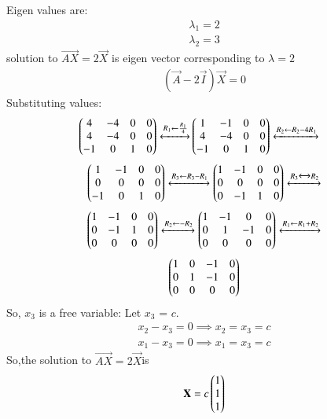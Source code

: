 \documentclass[journal,12pt,twocolumn]{IEEEtran}
\begin{document}
Eigen values are:
\begin{align}
 \lambda_1=2\\
 \lambda_2=3
 \end{align}
solution to $\vec{AX} =2\vec{X}$ is eigen vector corresponding to $\lambda=2$
\begin{align}
    (\vec{A}-2\vec{I})\vec X=0
\end{align}
Substituting values:
\begin{align}
\begin{pmatrix}4& -4&0&0\\
4 & -4 & 0&0\\
-1 & 0 &1&0
\end{pmatrix}
\xleftrightarrow[]{R_1 \leftarrow \frac{R_1}{4}} 
&
\begin{pmatrix}1&-1&0&0\\
4&-4&0&0\\
-1&0&1&0\end{pmatrix}
\xleftrightarrow[]{R_2 \leftarrow R_2-4R_1 } \nonumber 
\end{align}
\begin{align}
    \begin{pmatrix}1&-1&0&0\\
            0&0&0&0\\
            -1&0&1&0\end{pmatrix}
    \xleftrightarrow[]{R_3 \leftarrow R_3-R_1 }
    \begin{pmatrix}1&-1&0&0\\
            0&0&0&0\\
            0&-1&1&0\end{pmatrix}
    \xleftrightarrow[]{R_3 \xleftrightarrow[]{} R_2 } \nonumber
\end{align}
\begin{align}
    \begin{pmatrix}1&-1&0&0\\
    0&-1&1&0\\
    0&0&0&0\end{pmatrix}
    \xleftrightarrow[]{R_2 \leftarrow -R_2} 
    \begin{pmatrix}1&-1&0&0\\
    0&1&-1&0\\
    0&0&0&0\end{pmatrix}   
    \xleftrightarrow[]{R_1 \leftarrow R_1+R_2} \nonumber
\end{align}
\begin{align} \label{eq:eq_5}
    \begin{pmatrix}1&0&-1&0\\
    0&1&-1&0\\
    0&0&0&0\end{pmatrix} 
\end{align}
So, $x_3$ is a free variable: Let $x_3$ = $c$. 
\begin{align}
 {x_2}-{x_3}=0 \implies{x_2}={x_3}=c \\
 {x_1}-{x_3}=0 \implies{x_1}={x_3}=c 
 \end{align}
 So,the solution to $\vec{AX} =2\vec{X}$is
 \begin{align}\label{eq:555}
 \mathbf{X} = 
 c
 \begin{pmatrix}
 1\\1\\1
 \end{pmatrix}
\end{align}
\end{document}

